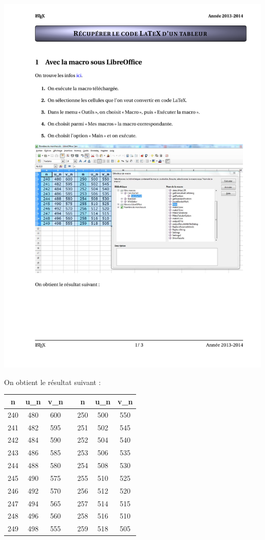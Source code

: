 \documentclass[12pt,french]{article}
\begin{document}
\begin{spacing}{1.2}
\begin{center}
\includegraphics[width=\textwidth]{calc2latex}
\end{center}

On obtient le résultat suivant :


\begin{center}
\begin{tabular}{|c|c|c|c|c|c|c|}
\hline
\textbf{n} & \textbf{u\_n} & \textbf{v\_n} & \textbf{} & \textbf{n} & \textbf{u\_n} & \textbf{v\_n} \\ \hline
240 & 480 & 600 &  & 250 & 500 & 550 \\ \hline
241 & 482 & 595 &  & 251 & 502 & 545 \\ \hline
242 & 484 & 590 &  & 252 & 504 & 540 \\ \hline
243 & 486 & 585 &  & 253 & 506 & 535 \\ \hline
244 & 488 & 580 &  & 254 & 508 & 530 \\ \hline
245 & 490 & 575 &  & 255 & 510 & 525 \\ \hline
246 & 492 & 570 &  & 256 & 512 & 520 \\ \hline
247 & 494 & 565 &  & 257 & 514 & 515 \\ \hline
248 & 496 & 560 &  & 258 & 516 & 510 \\ \hline
249 & 498 & 555 &  & 259 & 518 & 505 \\ \hline
\end{tabular}
\end{center}



\end{spacing}
\end{document}
